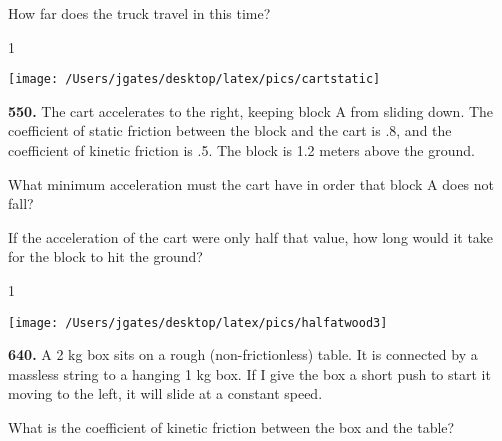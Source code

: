 \bigskip How far does the truck travel in this time?



\bigskip \vspace{6mm}%

\AddToShipoutPicture*{\BackgroundPic}

\addtocounter {ProbNum} {1}

\begin{floatingfigure}[r]{.2\textwidth}
\texttt{[image: /Users/jgates/desktop/latex/pics/cartstatic]}
\end{floatingfigure}
 
{\bf \Large{550.}} The cart accelerates to the right, keeping block A from sliding down. The coefficient of static friction between the block and the cart is .8, and the coefficient of kinetic friction is .5. The block is 1.2 meters above the ground.

\bigskip
What minimum acceleration must the cart have in order that block A does not fall? 

\bigskip If the acceleration of the cart were only half that value, how long would it take for the block to hit the ground?

\bigskip \bigskip \vspace{6mm}%

\AddToShipoutPicture*{\BackgroundPic}

\addtocounter {ProbNum} {1}

\begin{floatingfigure}[r]{.2\textwidth}
\texttt{[image: /Users/jgates/desktop/latex/pics/halfatwood3]}
\end{floatingfigure}
 
{\bf \Large{640.}} A 2 kg box sits on a rough (non-frictionless) table. It is connected by a massless string to a hanging 1 kg box.  If I give the box a short push to start it moving to the left, it will slide at a constant speed.
 
\bigskip
What is the coefficient of kinetic friction between the box and the table?\paragraph{}
\noindent
\bigskip 
\vspace{6mm}%

